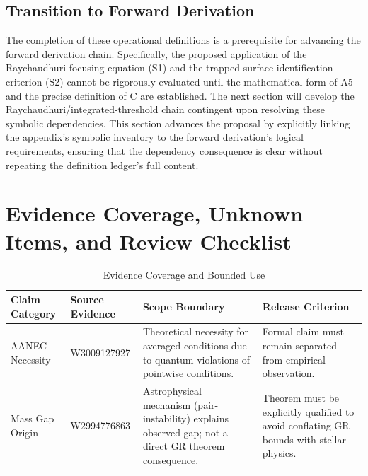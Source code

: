\documentclass[conference]{IEEEtran}
\begin{document}
\subsection{Transition to Forward Derivation}
The completion of these operational definitions is a prerequisite for advancing the forward derivation chain. Specifically, the proposed application of the Raychaudhuri focusing equation (S1) and the trapped surface identification criterion (S2) cannot be rigorously evaluated until the mathematical form of A5 and the precise definition of C are established. The next section will develop the Raychaudhuri/integrated-threshold chain contingent upon resolving these symbolic dependencies. This section advances the proposal by explicitly linking the appendix's symbolic inventory to the forward derivation's logical requirements, ensuring that the dependency consequence is clear without repeating the definition ledger's full content.

\section{Evidence Coverage, Unknown Items, and Review Checklist}
\begin{table}[htbp]
\centering
\footnotesize
\setlength{\tabcolsep}{3pt}
\renewcommand{\arraystretch}{1.12}
\caption{Evidence Coverage and Bounded Use}
\label{tab:appendix-evidence-and-review-block-1}
\begin{tabular}{|p{}|p{}|p{}|p{}|}
\hline
Claim Category & Source Evidence & Scope Boundary & Release Criterion \\\hline
AANEC Necessity & W3009127927 & Theoretical necessity for averaged conditions due to quantum violations of pointwise conditions. & Formal claim must remain separated from empirical observation. \\\hline
Mass Gap Origin & W2994776863 & Astrophysical mechanism (pair-instability) explains observed gap; not a direct GR theorem consequence. & Theorem must be explicitly qualified to avoid conflating GR bounds with stellar physics. \\\hline
\end{tabular}
\end{table}~\cite{cite_0ed84243cf171bc4,cite_7a407c865faafd11}
\end{document}
